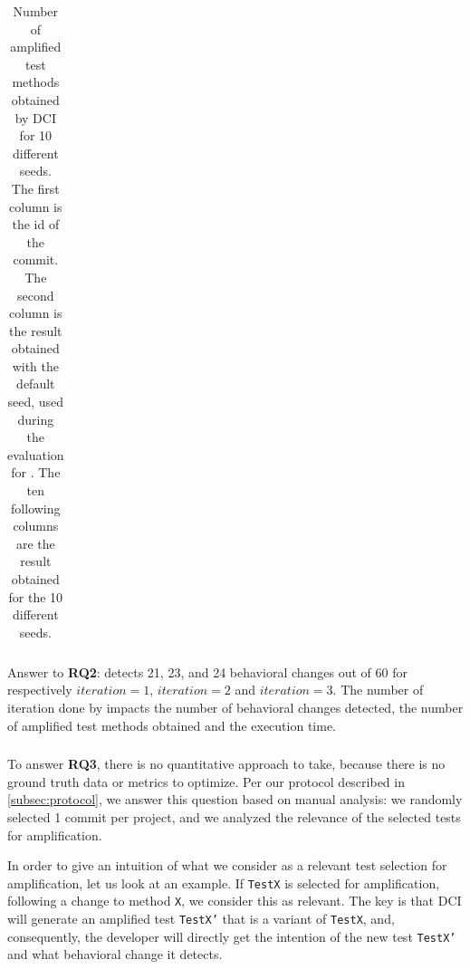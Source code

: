 \begin{table}
\small
\def\arraystretch{.5}%
\setlength\tabcolsep{3pt} %
\caption{Number of amplified test methods obtained by DCI for 10 different seeds. The first column is the id of the commit. The second column is the result obtained with the default seed, used during the evaluation for \rqdetection. The ten following columns are the result obtained for the 10 different seeds.}
\label{tab:overall_result_seeds}
\begin{tabular}{l|c|llllllllll}

\end{tabular}
\end{table}

\begin{mdframed}
Answer to \textbf{RQ2}: \DCII detects  21, 23, and 24 behavioral changes out of 60 for respectively $iteration=1$, $iteration=2$ and $iteration=3$.
The number of iteration done by \DCII impacts the number of behavioral changes detected, the number of amplified test methods obtained and the execution time.
\end{mdframed}


\subsubsection{\rqselection}
\label{subsubsec:answerq3}

To answer \textbf{RQ3}, there is no quantitative approach to take, because there is no ground truth data or metrics to optimize. 
Per our protocol described in \autoref{subsec:protocol}, we answer this question based on manual analysis:
we randomly selected 1 commit per project, and we analyzed the relevance of the selected tests for amplification.

In order to give an intuition of what we consider as a relevant test selection for amplification, let us look at an example. 
If \texttt{TestX} is selected for amplification, following a change to method \texttt{X}, we consider this as relevant. The key is that DCI will generate an amplified test \texttt{TestX'} that is a variant of \texttt{TestX}, and, consequently, the developer will directly get the intention of the new test \texttt{TestX'} and what behavioral change it detects.

